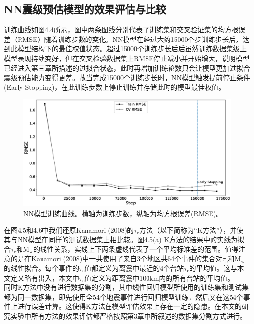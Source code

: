 \subsection{NN震级预估模型的效果评估与比较}
\indent 训练曲线如图4.4所示，图中两条图线分别代表了训练集和交叉验证集的均方根误差（RMSE）随着训练步数的变化。NN模型在经过大约15000个步训练步长后，达到此模型结构下的最佳权值状态。超过15000个训练步长后后虽然训练数据集级上模型表现持续变好，但在交叉检验数据集上RMSE停止减小并开始增大，说明模型已经进入第三章所描述的过拟合状态，此时再增加训练轮数只会让模型更加过拟合震级预估能力变得更差。故当完成15000个训练步长时，NN模型触发提前停止条件(Early Stopping)，在此训练步数上停止训练并存储此时的模型最佳权值。\\
\begin{figure}[!h]%
	\centering  %
	\includegraphics[width=\linewidth]{img/6.eps}  %
	\caption{NN模型训练曲线。横轴为训练步数，纵轴为均方根误差(RMSE)。}  %
	\label{fig:mcmthesis-logo}   %
\end{figure}
\indent 在图4.5和4.6中我们还原Kanamori (2008)的$\tau_{\mathrm{c}}$方法（以下简称为“K方法”），并使其与NN模型在同样的测试数据集上相比较。图4.5(a) K方法的结果中的实线为拟合$\tau_{\mathrm{c}}$和$\mathrm{M}_{\mathrm{w}}$的线性关系，实线上下两条虚线代表了一个平均标准差的范围。值得注意的是在Kanamori (2008)中一共使用了来自3个地区共54个事件的集合对$\tau_{\mathrm{c}}$和$\mathrm{M}_{\mathrm{w}}$的线性拟合。每个事件的$\tau_{\mathrm{c}}$值都定义为离震中最近的4个台站$\tau_{\mathrm{c}}$的平均值。这与本文定义略有出入，本文中$\tau_{\mathrm{c}}$值定义为距离震中100km内的所有台站的平均值。\\
\indent 同时K方法中没有进行数据集的分割，其中线性回归模型所使用的训练集和测试集都为同一数据集，即先使用全54个地震事件进行回归模型训练，然后又在这54个事件上进行误差计算。这使得K方法在模型评估效果上存在一定的隐患。在本文的研究实验中所有方法的效果评估都严格按照第3章中所叙述的数据集分割方式进行。\\
